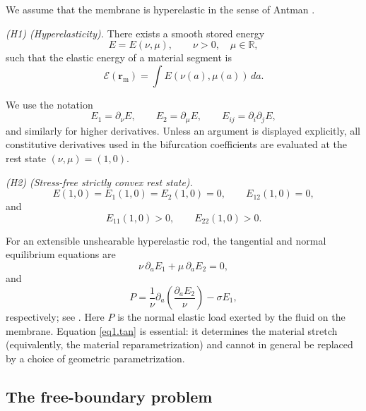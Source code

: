 \documentclass[12pt]{article}
\numberwithin{equation}{section}
\numberwithin{equation}{section}
\begin{document}
We assume that the membrane is hyperelastic in the sense of Antman \cite[Chapter 4]{Antman}.

\medskip
\noindent
\emph{(H1) (Hyperelasticity).}
There exists a smooth stored energy
\[
E=E(\nu,\mu),\qquad \nu>0,\quad \mu\in\mathbb R,
\]
such that the elastic energy of a material segment is
\[
\mathcal E(\mathbf r_{\mathrm m})
=\int E(\nu(a),\mu(a))\,da .
\]

We use the notation
\[
E_1=\partial_\nu E,\qquad E_2=\partial_\mu E,
\qquad E_{ij}=\partial_i\partial_j E,
\]
and similarly for higher derivatives.  Unless an argument is displayed explicitly,
all constitutive derivatives used in the bifurcation coefficients are evaluated at
the rest state $(\nu,\mu)=(1,0)$.

\medskip
\noindent
\emph{(H2) (Stress-free strictly convex rest state).}
\[
E(1,0)=E_1(1,0)=E_2(1,0)=0,\qquad
E_{12}(1,0)=0,
\]
and
\[
E_{11}(1,0)>0,\qquad E_{22}(1,0)>0.
\]

For an extensible unshearable hyperelastic rod, the tangential and normal equilibrium equations are
\begin{equation}\label{eq1.tan}
\nu\,\partial_a E_1+\mu\,\partial_a E_2=0,
\end{equation}
and
\begin{equation}\label{eq1.5}
P=
\frac1\nu\partial_a\!\left(\frac{\partial_aE_2}{\nu}\right)
-\sigma E_1,
\end{equation}
respectively; see \cite{BaldiT,BaldiT1}.  Here $P$ is the normal elastic load exerted by the fluid on the membrane.  Equation \eqref{eq1.tan} is essential: it determines the material stretch (equivalently, the material reparametrization) and cannot in general be replaced by a choice of geometric parametrization.

\subsection{The free-boundary problem}
\end{document}
